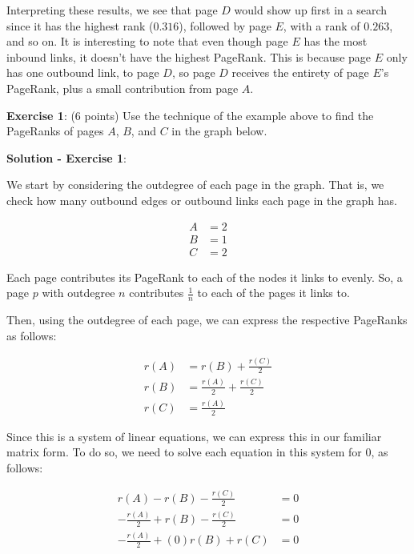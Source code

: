 \documentclass{article}
\begin{document}
Interpreting these results, we see that page $D$ would show up first in a search since it has the highest rank ($0.316$), followed by page $E$, with a rank of $0.263$, and so on. It is interesting to note that even though page $E$ has the most inbound links, it doesn't have the highest PageRank. This is because page $E$ only has one outbound link, to page $D$, so page $D$ receives the entirety of page $E$'s PageRank, plus a small contribution from page $A$.

\textbf{Exercise 1}: (6 points) Use the technique of the example above to find the PageRanks of pages $A$, $B$, and $C$ in the graph below.

\begin{center}
\end{center}


\textbf{Solution - Exercise 1}:

We start by considering the outdegree of each page in the graph. That is, we check how many outbound edges or outbound links each page in the graph has.

\begin{align*}
  A & = 2 \\
  B & = 1 \\
  C & = 2
\end{align*}

Each page contributes its PageRank to each of the nodes it links to evenly. So, a page $p$ with outdegree $n$ contributes $\frac{1}{n}$ to each of the pages it links to.

Then, using the outdegree of each page, we can express the respective PageRanks as follows:

\begin{align*}
  r(A) & = r(B) + \frac{r(C)}{2}           \\
  r(B) & = \frac{r(A)}{2} + \frac{r(C)}{2} \\
  r(C) & = \frac{r(A)}{2}
\end{align*}

Since this is a system of linear equations, we can express this in our familiar matrix form. To do so, we need to solve each equation in this system for $0$, as follows:

\begin{align*}
  r(A) - r(B) - \frac{r(C)}{2}             & = 0 \\
  - \frac{r(A)}{2} + r(B) - \frac{r(C)}{2} & = 0 \\
  - \frac{r(A)}{2} + (0)r(B) + r(C)        & = 0
\end{align*}
\end{document}
